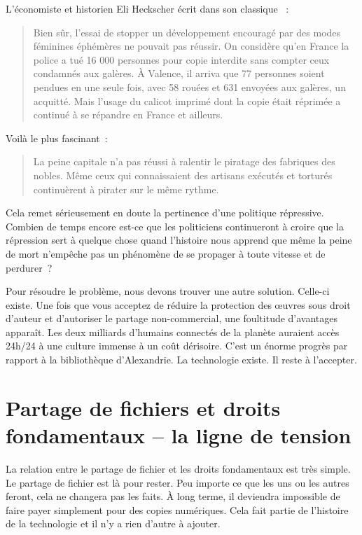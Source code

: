 L’économiste et historien Eli Heckscher écrit dans son classique ~:
\begin{quotation}
 Bien sûr, l’essai de stopper un développement encouragé par des modes féminines éphémères ne pouvait
pas réussir. On considère qu’en France la police a tué 16 000 personnes pour copie interdite sans
compter ceux condamnés aux galères. À Valence, il arriva que 77 personnes soient pendues en une seule fois, avec 58
rouées et 631 envoyées aux galères, un acquitté. Mais l’usage du calicot imprimé dont la copie était
réprimée a continué à se répandre en France et ailleurs.
\end{quotation}

Voilà le plus fascinant~:
\begin{quotation}
 La peine capitale n’a pas réussi à ralentir le piratage des fabriques des nobles. Même ceux qui
connaissaient des artisans exécutés et torturés continuèrent à pirater sur le même rythme.
\end{quotation}

Cela remet sérieusement en doute la pertinence d’une politique répressive. Combien de temps encore
est-ce que les politiciens continueront à croire que la répression sert à quelque chose quand
l’histoire nous apprend que même la peine de mort n’empêche pas un phénomène de se propager à toute
vitesse et de perdurer~?

Pour résoudre le problème, nous devons trouver une autre solution. Celle-ci existe. Une fois que
vous acceptez de réduire la protection des œuvres sous droit d’auteur et d’autoriser le partage
non-commercial, une foultitude d’avantages apparaît. Les deux milliards d’humains connectés de la
planète auraient accès 24h/24 à une culture immense à un coût dérisoire. C’est un
énorme progrès par rapport à la bibliothèque d’Alexandrie. La technologie existe. Il reste à
l’accepter.

\section{Partage de fichiers et droits fondamentaux – la ligne de tension}
 La relation entre le partage de fichier et les droits fondamentaux est très simple. Le partage de
fichier est là pour rester. Peu importe ce que les uns ou les autres feront, cela ne changera pas les faits. À long terme, il deviendra impossible de faire payer
simplement pour des copies numériques. Cela fait partie de l’histoire de la technologie et il n’y a
rien d’autre à ajouter.

